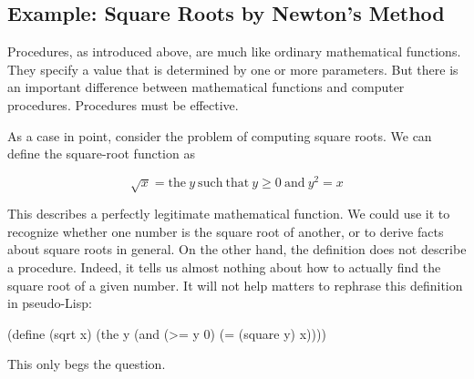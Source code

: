 \begin{schemedisplay}
\subsection{Example: Square Roots by Newton's Method}
\label{sec:1.1.7}

Procedures, as introduced above, are much like ordinary mathematical
functions.  They specify a value that is determined by one or more
parameters.  But there is an important difference between
mathematical functions and computer procedures.  Procedures must be
effective.

As a case in point, consider the problem of computing square
roots.  We can define the square-root function as

\begin{displaymath}
  \sqrt{x} = \mathrm{the}~ y ~\mathrm{such~that}~ y \ge 0 ~\mathrm{and}~ {y^2} = x
\end{displaymath}

This describes a perfectly legitimate mathematical function.  We could
use it to recognize whether one number is the square root of another, or
to derive facts about square roots in general.  On the other hand, the
definition does not describe a procedure.  Indeed, it tells us almost
nothing about how to actually find the square root of a given number.  It
will not help matters to rephrase this definition in pseudo-Lisp:

\begin{schemedisplay}
(define (sqrt x)
  (the y (and (>= y 0)
              (= (square y) x))))
\end{schemedisplay}

This only begs the question.


\end{schemedisplay}
